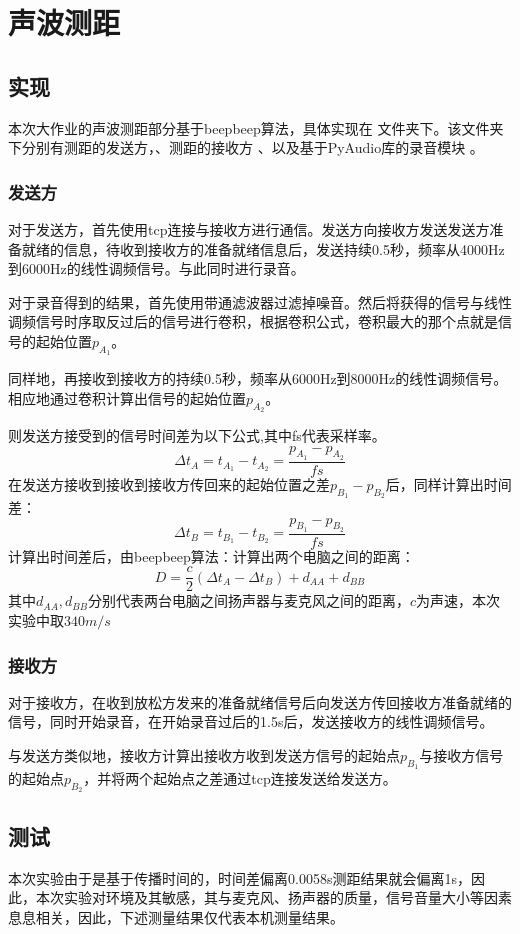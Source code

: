 \section{声波测距}
\subsection{实现}
本次大作业的声波测距部分基于beepbeep算法，具体实现在  文件夹下。该文件夹下分别有测距的发送方，、测距的接收方 、以及基于PyAudio库的录音模块 。 
\subsubsection{发送方}
对于发送方，首先使用tcp连接与接收方进行通信。发送方向接收方发送发送方准备就绪的信息，待收到接收方的准备就绪信息后，发送持续0.5秒，频率从4000Hz到6000Hz的线性调频信号。与此同时进行录音。

对于录音得到的结果，首先使用带通滤波器过滤掉噪音。然后将获得的信号与线性调频信号时序取反过后的信号进行卷积，根据卷积公式，卷积最大的那个点就是信号的起始位置$p_{A_1}$。

同样地，再接收到接收方的持续0.5秒，频率从6000Hz到8000Hz的线性调频信号。相应地通过卷积计算出信号的起始位置$p_{A_2}$。

则发送方接受到的信号时间差为以下公式,其中fs代表采样率。
$$
\Delta t_A = t_{A_1} - t_{A_2}=\frac{p_{A_1}-p_{A_2}}{fs}
$$
在发送方接收到接收到接收方传回来的起始位置之差$p_{B_1}-p_{B_2}$后，同样计算出时间差：
$$
\Delta t_B = t_{B_1} - t_{B_2}=\frac{p_{B_1}-p_{B_2}}{fs}
$$
计算出时间差后，由beepbeep算法：计算出两个电脑之间的距离：
$$
D = \frac{c}{2}(\Delta t_A - \Delta t_B) + d_{AA} + d_{BB}
$$
其中$d_{AA} , d_{BB}$分别代表两台电脑之间扬声器与麦克风之间的距离，$c$为声速，本次实验中取$340m/s$
\subsubsection{接收方}
对于接收方，在收到放松方发来的准备就绪信号后向发送方传回接收方准备就绪的信号，同时开始录音，在开始录音过后的1.5s后，发送接收方的线性调频信号。

与发送方类似地，接收方计算出接收方收到发送方信号的起始点$p_{B_1}$与接收方信号的起始点$p_{B_2}$，并将两个起始点之差通过tcp连接发送给发送方。
\subsection{测试}
本次实验由于是基于传播时间的，时间差偏离0.0058s测距结果就会偏离1s，因此，本次实验对环境及其敏感，其与麦克风、扬声器的质量，信号音量大小等因素息息相关，因此，下述测量结果仅代表本机测量结果。

